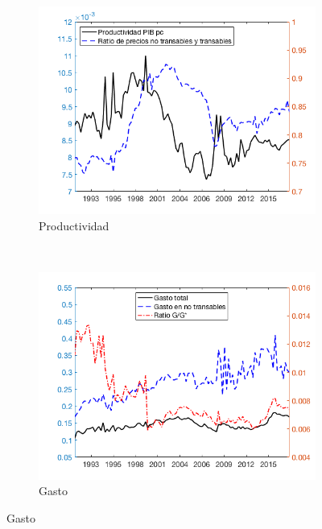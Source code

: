 \documentclass[12pt,letterpaper]{article}
\begin{document}
\begin{figure}
\begin{subfigure}[b]{0.49\textwidth}
        \includegraphics[width=\textwidth]{fig11}
        \caption{Productividad}
    \end{subfigure}
    ~ %
    \begin{subfigure}[b]{0.49\textwidth}
        \includegraphics[width=\textwidth]{fig12}
        \caption{Gasto}
    \end{subfigure}
\end{figure}
\end{document}
